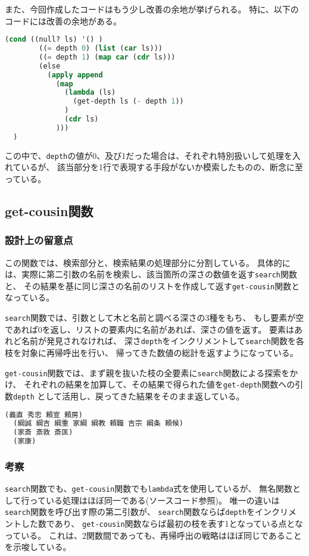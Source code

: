 \documentclass[11pt,a4paper, uplatex]{jsarticle}
\begin{document}
また、今回作成したコードはもう少し改善の余地が挙げられる。
特に、以下のコードには改善の余地がある。
\begin{lstlisting}[language=lisp, caption=\texttt{get-depth}関数一部]
  (cond ((null? ls) '() )
        ((= depth 0) (list (car ls)))
        ((= depth 1) (map car (cdr ls)))
        (else
          (apply append
            (map
              (lambda (ls)
                (get-depth ls (- depth 1))
              )
              (cdr ls)
            )))
  )
\end{lstlisting}
この中で、\texttt{depth}の値が0、及び1だった場合は、それぞれ特別扱いして処理を入れているが、
該当部分を1行で表現する手段がないか模索したものの、断念に至っている。

\subsection{get-cousin関数}
\subsubsection{設計上の留意点}
この関数では、検索部分と、検索結果の処理部分に分割している。
具体的には、実際に第二引数の名前を検索し、該当箇所の深さの数値を返す\texttt{search}関数と、
その結果を基に同じ深さの名前のリストを作成して返す\texttt{get-cousin}関数となっている。

\texttt{search}関数では、引数として木と名前と調べる深さの3種をもち、
もし要素が空であれば0を返し、リストの要素内に名前があれば、深さの値を返す。
要素はあれど名前が発見されなければ、
深さ\texttt{depth}をインクリメントして\texttt{search}関数を各枝を対象に再帰呼出を行い、
帰ってきた数値の総計を返すようになっている。

\texttt{get-cousin}関数では、まず親を抜いた枝の全要素に\texttt{search}関数による探索をかけ、
それぞれの結果を加算して、その結果で得られた値を\texttt{get-depth}関数への引数\texttt{depth}
として活用し、戻ってきた結果をそのまま返している。

\begin{lstlisting}[language=lisp, caption=\texttt{get-cousin}関数実行例()]
  (義直 秀忠 頼宣 頼房)
  (綱誠 綱吉 綱重 家綱 綱教 頼職 吉宗 綱条 頼候)
  (家斎 斎敦 斎匡)
  (家康)
\end{lstlisting}
\subsubsection{考察}
\texttt{search}関数でも、\texttt{get-cousin}関数でも\texttt{lambda}式を使用しているが、
無名関数として行っている処理はほぼ同一である(ソースコード参照)。
唯一の違いは\texttt{search}関数を呼び出す際の第二引数が、
\texttt{search}関数ならば\texttt{depth}をインクリメントした数であり、
\texttt{get-cousin}関数ならば最初の枝を表す1となっている点となっている。
これは、2関数間であっても、再帰呼出の戦略はほぼ同じであることを示唆している。
\end{document}
